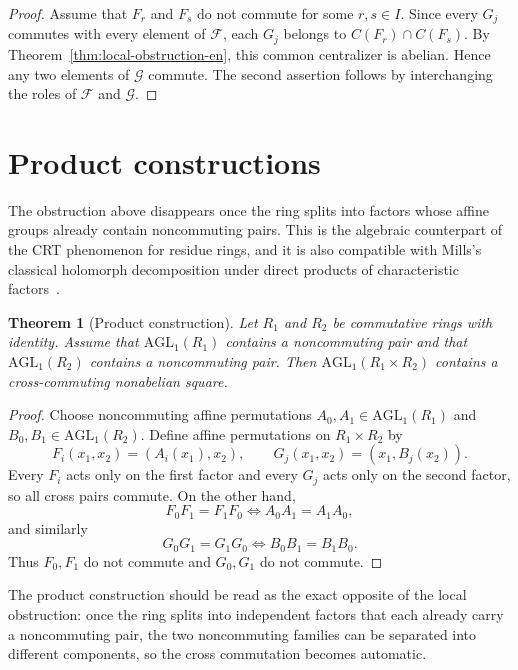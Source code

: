 \documentclass[11pt]{article}
\newcommand{\AGL}{\mathrm{AGL}_1}
\theoremstyle{uprightthm}
\newtheorem{theorem}{Theorem}[section]
\begin{document}
\begin{proof}
Assume that $F_r$ and $F_s$ do not commute for some $r,s\in I$. Since every
$G_j$ commutes with every element of $\mathcal F$, each $G_j$ belongs to
$C(F_r)\cap C(F_s)$. By Theorem~\ref{thm:local-obstruction-en}, this common
centralizer is abelian. Hence any two elements of $\mathcal G$ commute. The
second assertion follows by interchanging the roles of $\mathcal F$ and
$\mathcal G$.
\end{proof}

\section{Product constructions}
The obstruction above disappears once the ring splits into factors whose affine
groups already contain noncommuting pairs. This is the algebraic counterpart of
the CRT phenomenon for residue rings, and it is also compatible with Mills's
classical holomorph decomposition under direct products of characteristic
factors~\cite{Mills1961}.

\begin{theorem}[Product construction]
\label{thm:product-construction-en}
Let $R_1$ and $R_2$ be commutative rings with identity. Assume that
$\AGL(R_1)$ contains a noncommuting pair and that $\AGL(R_2)$ contains a
noncommuting pair. Then $\AGL(R_1\times R_2)$ contains a cross-commuting
nonabelian square.
\end{theorem}

\begin{proof}
Choose noncommuting affine permutations $A_0,A_1\in\AGL(R_1)$ and
$B_0,B_1\in\AGL(R_2)$. Define affine permutations on $R_1\times R_2$ by
\[
F_i(x_1,x_2)=(A_i(x_1),x_2),\qquad
G_j(x_1,x_2)=(x_1,B_j(x_2)).
\]
Every $F_i$ acts only on the first factor and every $G_j$ acts only on the
second factor, so all cross pairs commute. On the other hand,
\[
F_0F_1=F_1F_0 \iff A_0A_1=A_1A_0,
\]
and similarly
\[
G_0G_1=G_1G_0 \iff B_0B_1=B_1B_0.
\]
Thus $F_0,F_1$ do not commute and $G_0,G_1$ do not commute.
\end{proof}

The product construction should be read as the exact opposite of the local
obstruction: once the ring splits into independent factors that each already
carry a noncommuting pair, the two noncommuting families can be separated into
different components, so the cross commutation becomes automatic.
\end{document}
